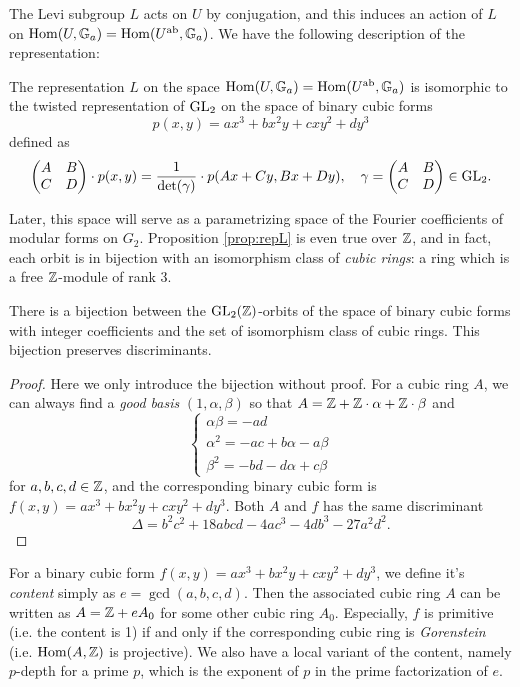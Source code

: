 The Levi subgroup $L$ acts on $U$ by conjugation, and this induces an action of $L$ on $\mathrm{Hom}(U, \mathbb{G}_a) = \mathrm{Hom}(U^{\mathrm{ab}}, \mathbb{G}_a)$.
We have the following description of the representation:
\begin{proposition}
\label{prop:repL}
The representation $L$ on the space $\mathrm{Hom}(U, \mathbb{G}_a) = \mathrm{Hom}(U^\mathrm{ab} , \mathbb{G}_a)$ is isomorphic to the twisted representation of $\mathrm{GL}_2$ on the space of binary cubic forms
$$
p(x, y) = ax^3 + bx^2 y + cxy^2 + dy^3
$$
defined as
$$
\begin{pmatrix}
    A & B \\ C & D
\end{pmatrix} \cdot p(x, y) = \frac{1}{\det(\gamma)} \cdot p(Ax + Cy, Bx + Dy), \quad \gamma = \begin{pmatrix}
    A & B \\ C & D
\end{pmatrix} \in \mathrm{GL}_2.
$$
\end{proposition}

Later, this space will serve as a parametrizing space of the Fourier coefficients of modular forms on $G_2$.
Proposition \ref{prop:repL} is even true over $\mathbb{Z}$, and in fact, each orbit is in bijection with an isomorphism class of \emph{cubic rings}: a ring which is a free $\mathbb{Z}$-module of rank 3.

\begin{proposition}
\label{prop:bcfcubic}
There is a bijection between the $\mathrm{GL}_2(\mathbb{Z})$-orbits of the space of binary cubic forms with integer coefficients and the set of isomorphism class of cubic rings.
This bijection preserves discriminants.
\end{proposition}
\begin{proof}
Here we only introduce the bijection without proof.
For a cubic ring $A$, we can always find a \emph{good basis} $(1, \alpha, \beta)$ so that $A = \mathbb{Z} + \mathbb{Z} \cdot \alpha + \mathbb{Z} \cdot \beta$ and
$$
\begin{cases}
    \alpha \beta = -ad \\
    \alpha^2 = -ac + b \alpha - a \beta \\
    \beta^2 = -bd - d \alpha + c \beta
\end{cases}
$$
for $a, b, c, d \in \mathbb{Z}$, and the corresponding binary cubic form is $f(x, y) = ax^3 + bx^2 y + cxy^2 + dy^3$.
Both $A$ and $f$ has the same discriminant
$$
    \Delta = b^2 c^2 + 18abcd - 4ac^3 - 4db^3 - 27 a^2 d^2.
$$
\end{proof}
For a binary cubic form $f(x, y) = ax^3 + bx^2 y + cx y^2 + dy^3$, we define it's \emph{content} simply as $e = \gcd(a, b, c, d)$.
Then the associated cubic ring $A$ can be written as $A = \mathbb{Z} + e A_0$ for some other cubic ring $A_0$.
Especially, $f$ is primitive (i.e. the content is 1) if and only if the corresponding cubic ring is \emph{Gorenstein} (i.e. $\mathrm{Hom}(A, \mathbb{Z})$ is projective).
We also have a local variant of the content, namely $p$-depth for a prime $p$, which is the exponent of $p$ in the prime factorization of $e$.
